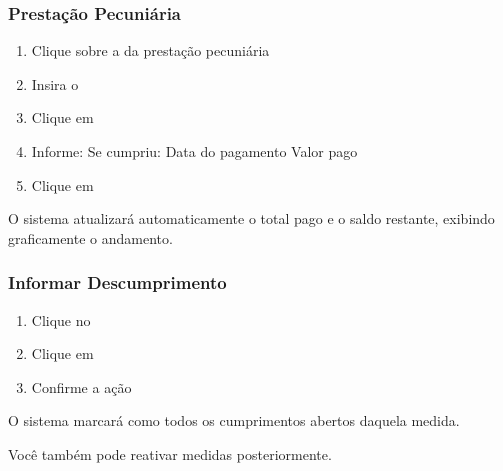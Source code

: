 \documentclass[letterpaper,10pt,brazil]{sphinxmanual}
\begin{document}
\subsubsection{Prestação Pecuniária}
\label{\detokenize{projud_58_cadastrocumprimentomedida:prestacao-pecuniaria}}\begin{enumerate}
%
\item {} 
\sphinxAtStartPar
Clique sobre a  da prestação pecuniária

\item {} 
\sphinxAtStartPar
Insira o 

\item {} 
\sphinxAtStartPar
Clique em 

\item {} 
\sphinxAtStartPar
Informe:
\sphinxhyphen{} Se cumpriu: 
\sphinxhyphen{} Data do pagamento
\sphinxhyphen{} Valor pago

\item {} 
\sphinxAtStartPar
Clique em 

\end{enumerate}

\sphinxAtStartPar
O sistema atualizará automaticamente o total pago e o saldo restante, exibindo graficamente o andamento.


\subsubsection{Informar Descumprimento}
\label{\detokenize{projud_58_cadastrocumprimentomedida:informar-descumprimento}}\begin{enumerate}
%
\item {} 
\sphinxAtStartPar
Clique no 

\item {} 
\sphinxAtStartPar
Clique em 

\item {} 
\sphinxAtStartPar
Confirme a ação

\end{enumerate}

\sphinxAtStartPar
O sistema marcará como  todos os cumprimentos abertos daquela medida.

\sphinxAtStartPar
Você também pode reativar medidas posteriormente.
\end{document}

